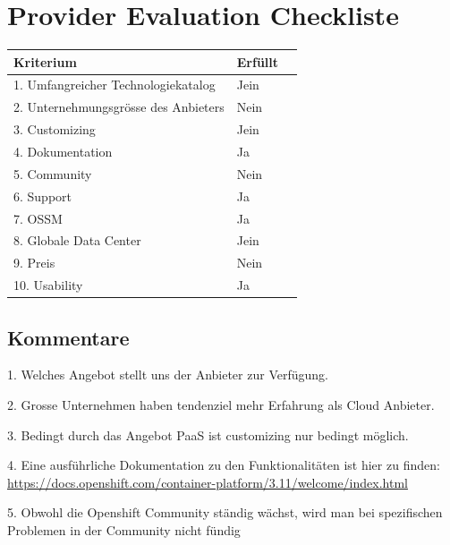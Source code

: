 \documentclass[12pt,a4paper]{article}
\begin{document}
\section{Provider Evaluation Checkliste}
    \begin{table}[H]
        \begin{tabular}{lll}
            \hline
            \textbf{Kriterium}  & \textbf{Erfüllt}                    \\ \hline
            1. Umfangreicher Technologiekatalog     & Jein            \\
            2. Unternehmungsgrösse des Anbieters    & Nein            \\
            3. Customizing                          & Jein            \\
            4. Dokumentation                        & Ja              \\
            5. Community                            & Nein            \\
            6. Support                              & Ja              \\
            7. OSSM                                 & Ja              \\
            8. Globale Data Center                  & Jein            \\
            9. Preis                                & Nein            \\
            10. Usability                           & Ja              \\ \hline
        \end{tabular}
    \end{table}

\subsection{Kommentare}

1. Welches Angebot stellt uns der Anbieter zur Verfügung.

2. Grosse Unternehmen haben tendenziel mehr Erfahrung als Cloud Anbieter.

3. Bedingt durch das Angebot PaaS ist customizing nur bedingt möglich.

4. Eine ausführliche Dokumentation zu den Funktionalitäten ist hier zu finden: \url{https://docs.openshift.com/container-platform/3.11/welcome/index.html}

5. Obwohl die Openshift Community ständig wächst, wird man bei spezifischen Problemen in der Community nicht fündig
\end{document}
